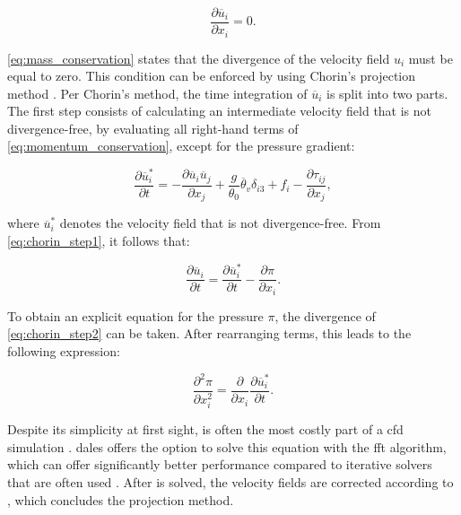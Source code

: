 \begin{equation}
    \frac{\partial \overline{u}_i}{\partial x_i} = 0. \label{eq:mass_conservation}
\end{equation}

\autoref{eq:mass_conservation} states that the divergence of the velocity field $u_i$ must be equal to zero. This condition can be enforced by using Chorin's projection method \citep{chorinNumericalSolutionNavierStokes1967}. Per Chorin's method, the time integration of $\overline{u}_i$ is split into two parts. The first step consists of calculating an intermediate velocity field that is not divergence-free, by evaluating all right-hand terms of \autoref{eq:momentum_conservation}, except for the pressure gradient:

\begin{equation}
    \frac{\partial \overline{u}^*_i}{\partial t} = - \frac{\partial \overline{u}_i \overline{u}_j}{\partial x_j} + \frac{g}{\theta_0}\overline{\theta}_v \delta_{i3} + f_i - \frac{\partial \tau_{ij}}{\partial x_j}, \label{eq:chorin_step1}
\end{equation}

where $\overline{u}^*_i$ denotes the velocity field that is not divergence-free. From \autoref{eq:chorin_step1}, it follows that:

\begin{equation}
    \frac{\partial \overline{u}_i}{\partial t} = \frac{\partial \overline{u}^*_i}{\partial t} - \frac{\partial \pi}{\partial x_i}. \label{eq:chorin_step2}
\end{equation}

To obtain an explicit equation for the pressure $\pi$, the divergence of \autoref{eq:chorin_step2} can be taken. After rearranging terms, this leads to the following expression:

\begin{equation}
    \frac{\partial^2 \pi}{\partial x_i^2} = \frac{\partial}{\partial x_i} \frac{\partial \overline{u}_i^*}{\partial t}. \label{eq:poisson_equation}
\end{equation}

Despite its simplicity at first sight,  is often the most costly part of a \acrshort{cfd} simulation \citep{costaFFTbasedFinitedifferenceSolver2018}. \acrshort{dales} offers the option to solve this equation with the \acrfull{fft} algorithm, which can offer significantly better performance compared to iterative solvers that are often used \citep{hockneyFastDirectSolution1965}. After  is solved, the velocity fields are corrected according to , which concludes the projection method.

